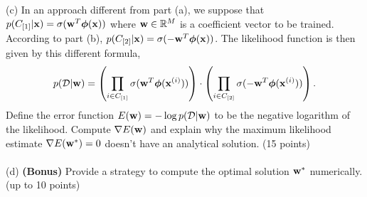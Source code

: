 \documentclass[12pt,a4paper]{article}
\renewcommand{\v}[1]{\ifmmode\mathbf{#1}\fi}
\renewcommand{\l}{\left}
\renewcommand{\r}{\right}
\def\R{\ifmmode\mathbb R\fi}
\begin{document}
(c) In an approach different from part (a), we suppose that $p(C_{[1]} \vert \v x) = \sigma(\v w^T \boldsymbol\phi(\v x))$ where $\v w \in \R^M$ is a coefficient vector to be trained. According to part (b), $p(C_{[2]} \vert \v x) = \sigma(-\v w^T \boldsymbol\phi(\v x))$. The likelihood function is then given by this different formula,
\begin{equation*}
p(\mathcal D \vert \v w) = \l(\prod_{i\in C_{[1]}} \sigma(\v w^T \boldsymbol\phi(\v x^{(i)}))\r) \cdot \l(\prod_{i\in C_{[2]}} \sigma( - \v w^T \boldsymbol\phi(\v x^{(i)}))\r).
\end{equation*}
Define the error function $E(\v w) = -\log p(\mathcal D \vert \v w)$ to be the negative logarithm of the likelihood. Compute $\nabla E(\v w)$ and explain why the maximum likelihood estimate $\nabla E(\v w^\ast) = 0$ doesn't have an analytical solution. (15 points) \\
\\
(d) \textbf{(Bonus)} Provide a strategy to compute the optimal solution $\v w^\ast$ numerically. (up to 10 points)
\end{document}

